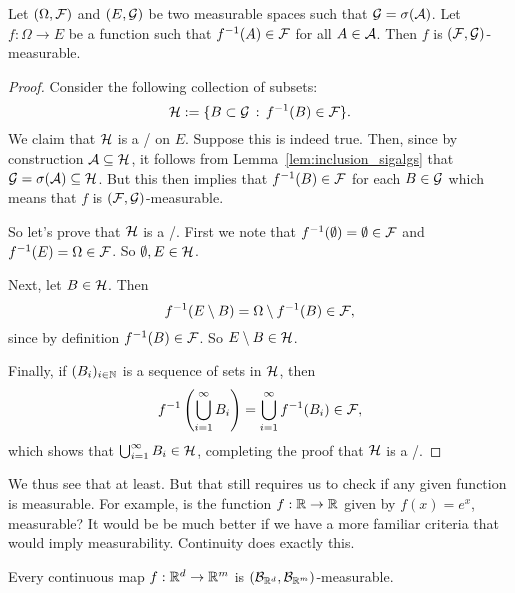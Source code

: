\begin{lemma}\label{lem:measurable_condition_generator}
Let $(\Omega, \mathcal F)$ and $(E, \mathcal G)$ be two measurable spaces such that $\mathcal G = \sigma(\mathcal A)$. Let $f: \Omega \to E$ be a function such that $f^{-1}(A) \in \mathcal F$ for all $A \in \mathcal A$. Then $f$ is $(\mathcal F, \mathcal G)$-measurable.
\end{lemma}

\begin{proof}
Consider the following collection of subsets:
\[
	\mathcal H := \{B \subset \mathcal G \, : \, f^{-1}(B) \in \mathcal F\}.
\]
We claim that $\mathcal H$ is a \sigalg/ on $E$. Suppose this is indeed true. Then, since by construction $\mathcal A \subseteq \mathcal H$, it follows from Lemma~\ref{lem:inclusion_sigalgs} that $\mathcal G = \sigma(\mathcal A) \subseteq \mathcal H$. But this then implies that $f^{-1}(B) \in \mathcal F$ for each $B \in \mathcal G$ which means that $f$ is $(\mathcal F, \mathcal G)$-measurable.

So let's prove that $\mathcal H$ is a \sigalg/. First we note that $f^{-1}(\emptyset) = \emptyset \in \mathcal F$ and $f^{-1}(E) = \Omega \in \mathcal F$. So $\emptyset, E \in \mathcal H$. 

Next, let $B \in \mathcal H$. Then
\[
	f^{-1}(E\setminus B) = \Omega \setminus f^{-1}(B) \in \mathcal F,
\]
since by definition $f^{-1}(B) \in \mathcal F$. So $E\setminus B \in \mathcal H$.

Finally, if $(B_i)_{i \in \mathbb N}$ is a sequence of sets in $\mathcal H$, then
\[
	f^{-1}\left(\bigcup_{i = 1}^\infty B_i\right) = \bigcup_{i = 1}^\infty f^{-1}(B_i) \in \mathcal F,
\]
which shows that $\bigcup_{i = 1}^\infty B_i \in \mathcal H$, completing the proof that $\mathcal H$ is a \sigalg/.
\end{proof}

We thus see that at least. But that still requires us to check if any given function is measurable. For example, is the function $f : \mathbb R \to \mathbb R$ given by $f(x) = e^x$, measurable? It would be be much better if we have a more familiar criteria that would imply measurability. Continuity does exactly this. 

\pagebreak

\begin{proposition}
Every continuous map $f : \mathbb R^d \to \mathbb R^m$ is $(\mathcal B_{\mathbb R^d}, \mathcal B_{\mathbb R^m})$-measurable.
\end{proposition}

